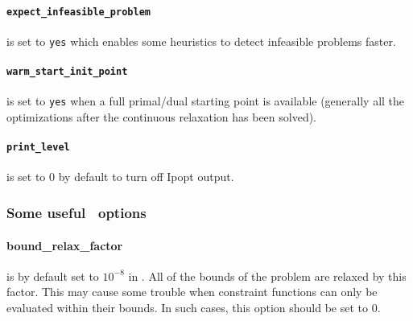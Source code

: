 \paragraph{\tt expect\_infeasible\_problem} is set to {\tt yes} which enables some heuristics
to detect infeasible problems faster.

\paragraph{\tt warm\_start\_init\_point} is set to {\tt yes} when a full primal/dual starting
point is available (generally all the optimizations after the continuous relaxation has been solved).

\paragraph{\tt print\_level} is set to $0$ by default to turn off Ipopt output.
\subsubsection{Some useful \Ipopt\ options}
\paragraph{bound\_relax\_factor} is by default set to $10^{-8}$ in \Ipopt. All of the bounds
of the problem are relaxed by this factor. This may cause some trouble
when constraint functions can only be evaluated within their bounds.
In such cases, this
option should be set to 0.
